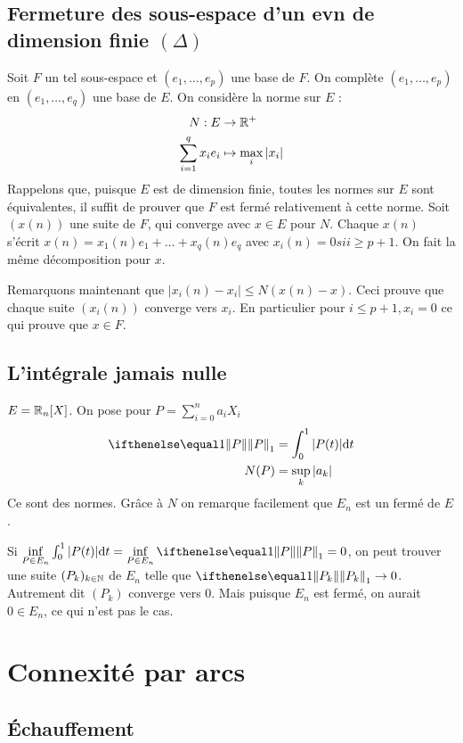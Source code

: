 \subsection{Fermeture des sous-espace d'un evn de dimension finie \texorpdfstring{$(\Delta)$}{Delta}}
Soit $F$ un tel sous-espace et $(e_1,\ldots,e_p)$ une base de $F$. On complète $(e_1,\ldots,e_p)$ en $(e_1,\ldots,e_q)$ une base de $E$. On considère la norme sur $E$ :
$$
    \begin{aligned}
        N:E&\rightarrow \mathbb{R}^+\\
        \sum_{i=1}^q x_ie_i &\mapsto \max_i\vert x_i\vert
    \end{aligned}
$$
Rappelons que, puisque $E$ est de dimension finie, toutes les normes sur $E$ sont équivalentes, il suffit de prouver que $F$ est fermé relativement à cette norme. Soit $(x(n))$ une suite de $F$, qui converge avec $x\in E$ pour $N$. Chaque $x(n)$ s'écrit $x(n)=x_1(n)e_1+\ldots+x_q(n)e_q$ avec $x_i(n) =0 si i\geqslant p+1$. On fait la même décomposition pour $x$.

Remarquons maintenant que $\vert x_i(n)-x_i\vert \leqslant N(x(n)-x)$. Ceci prouve que chaque suite $(x_i(n))$ converge vers $x_i$. En particulier pour $i \leqslant p+1 ,x_i=0$ ce qui prouve que $x\in F$.

\subsection{L'intégrale jamais nulle}
$E=\mathbb{R}_n[X]$. On pose pour $P=\sum\limits_{i=0}^n a_i X_i$ 
$$
    \begin{aligned}
        \norme{P}{1}&=\int_0^1\vert P(t) \vert \dd t\\
        N(P) &= \sup_k \vert a_k\vert
    \end{aligned}
$$
Ce sont des normes. Grâce à $N$ on remarque facilement que $E_n$ est un fermé de $E$.

Si $\inf\limits_{P\in E_n} \int_0^1\vert P(t)\vert \dd t = \inf\limits_{P\in E_n}\norme{P}{1}=0$, on peut trouver une suite $(P_k)_{k\in\mathbb{N}}$ de $E_n$ telle que  $\norme{P_k}{1}\ra 0$. Autrement dit $(P_k)$ converge vers 0. Mais puisque $E_n$ est fermé, on aurait $0\in E_n$, ce qui n'est pas le cas.

\section{Connexité par arcs}

\subsection{Échauffement}


